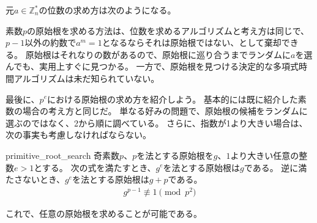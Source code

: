 元$a \in \mathbb{Z}_n^*$の位数の求め方は次のようになる。


素数$p$の原始根を求める方法は、位数を求めるアルゴリズムと考え方は同じで、$p-1$以外の約数で$a^{m}=1$となるならそれは原始根ではない、として棄却できる。
原始根はそれなりの数があるので、原始根に巡り合うまでランダムに$a$を選んでも、実用上すぐに見つかる。
一方で、原始根を見つける決定的な多項式時間アルゴリズムは未だ知られていない。

最後に、$p^e$における原始根の求め方を紹介しよう。
基本的には既に紹介した素数の場合の考え方と同じだ。
単なる好みの問題で、原始根の候補をランダムに選ぶのではなく、2から順に調べている。
さらに、指数が1より大きい場合は、次の事実も考慮しなければならない。

\begin{Prop}{}{primitive_root_search}
奇素数$p$、$p$を法とする原始根を$g$、$1$より大きい任意の整数$e>1$とする。
次の式を満たすとき、$g^e$を法とする原始根は$g$である。
逆に満たさないとき、$g^e$を法とする原始根は$g+p$である。
\begin{align*}
g^{p-1} \not\equiv 1 \pmod{p^2}
\end{align*}
\end{Prop}

これで、任意の原始根を求めることが可能である。

